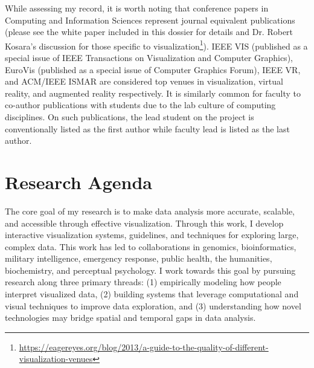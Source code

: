 \documentclass[11pt]{article}
\begin{document}
While assessing my record, it is worth noting that conference papers in Computing and Information Sciences represent journal equivalent publications (please see the white paper included in this dossier for details and Dr. Robert Kosara's discussion for those specific to visualization\footnote{\url{https://eagereyes.org/blog/2013/a-guide-to-the-quality-of-different-visualization-venues}}). IEEE VIS (published as a special issue of IEEE Transactions on Visualization and Computer Graphics), EuroVis (published as a special issue of Computer Graphics Forum), IEEE VR, and ACM/IEEE ISMAR are considered top venues in visualization, virtual reality, and augmented reality respectively. It is similarly common for faculty to co-author publications with students due to the lab culture of computing disciplines. On such publications, the lead student on the project is conventionally listed as the first author while faculty lead is listed as the last author. 




\section*{Research Agenda}
The core goal of my research is to make data analysis more accurate, scalable, and accessible through effective visualization. Through this work, I develop interactive visualization systems, guidelines, and techniques for exploring large, complex data. This work has led to collaborations in genomics, bioinformatics, military intelligence, emergency response, public health, the humanities, biochemistry, and perceptual psychology. I work towards this goal by pursuing research along three primary threads: (1) empirically modeling how people interpret visualized data, (2) building systems that leverage computational and visual techniques to improve data exploration, and (3) understanding how novel technologies may bridge spatial and temporal gaps in data analysis. 
\end{document}
